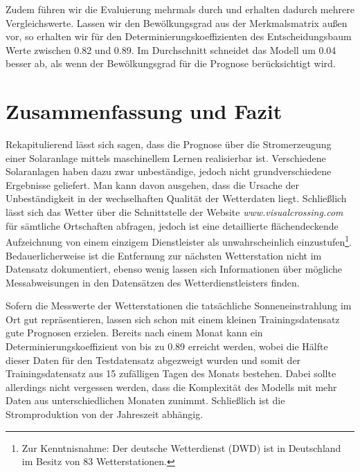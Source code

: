 \documentclass[12pt, a4paper]{article}
\begin{document}
Zudem führen wir die Evaluierung mehrmals durch und erhalten dadurch mehrere Vergleichswerte. Lassen wir den Bewölkungsgrad aus der Merkmalsmatrix außen vor, so erhalten wir für den Determinierungskoeffizienten des Entscheidungsbaum Werte zwischen 0.82 und 0.89. Im Durchschnitt schneidet das Modell um 0.04 besser ab, als wenn der Bewölkungsgrad für die Prognose berücksichtigt wird. 



\newpage

\section{Zusammenfassung und Fazit}
\label{sec:conclusion}

Rekapitulierend lässt sich sagen, dass die Prognose über die Stromerzeugung einer Solaranlage mittels maschinellem Lernen realisierbar ist. Verschiedene Solaranlagen haben dazu zwar unbeständige, jedoch nicht grundverschiedene Ergebnisse geliefert. Man kann davon ausgehen, dass die Ursache der Unbeständigkeit in der wechselhaften Qualität der Wetterdaten liegt. Schließlich lässt sich das Wetter über die Schnittstelle der Website \textit{www.visualcrossing.com} für sämtliche Ortschaften abfragen, jedoch ist eine detaillierte flächendeckende Aufzeichnung von einem einzigem Dienstleister als unwahrscheinlich einzustufen\footnote{Zur Kenntnisnahme: Der deutsche Wetterdienst (DWD) ist in Deutschland im Besitz von 83 Wetterstationen.}. Bedauerlicherweise ist die Entfernung zur nächsten Wetterstation nicht im Datensatz dokumentiert, ebenso wenig lassen sich Informationen über mögliche Messabweisungen in den Datensätzen des Wetterdienstleisters finden.


Sofern die Messwerte der Wetterstationen die tatsächliche Sonneneinstrahlung im Ort gut repräsentieren, lassen sich schon mit einem kleinen Trainingsdatensatz gute Prognosen erzielen. Bereits nach einem Monat kann ein Determinierungskoeffizient von bis zu 0.89 erreicht werden, wobei die Hälfte dieser Daten für den Testdatensatz abgezweigt wurden und somit der Trainingsdatensatz aus 15 zufälligen Tagen des Monats bestehen. Dabei sollte allerdings nicht vergessen werden, dass die Komplexität des Modells mit mehr Daten aus unterschiedlichen Monaten zunimmt. Schließlich ist die Stromproduktion von der Jahreszeit abhängig. 
\end{document}
